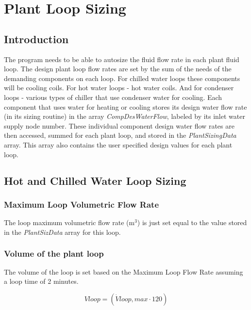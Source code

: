 \section{Plant Loop Sizing}\label{plant-loop-sizing}

\subsection{Introduction}\label{introduction-000}

The program needs to be able to autosize the fluid flow rate in each plant fluid loop. The design plant loop flow rates are set by the sum of the needs of the demanding components on each loop. For chilled water loops these components will be cooling coils. For hot water loops - hot water coils. And for condenser loops - various types of chiller that use condenser water for cooling. Each component that uses water for heating or cooling stores its design water flow rate (in its sizing routine) in the array \emph{CompDesWaterFlow}, labeled by its inlet water supply node number. These individual component design water flow rates are then accessed, summed for each plant loop, and stored in the \emph{PlantSizingData} array. This array also contains the user specified design values for each plant loop.

\subsection{Hot and Chilled Water Loop Sizing}\label{hot-and-chilled-water-loop-sizing}

\subsubsection{Maximum Loop Volumetric Flow Rate}\label{maximum-loop-volumetric-flow-rate}

The loop maximum volumetric flow rate (m\(^{3}\)) is just set equal to the value stored in the \emph{PlantSizData} array for this loop.

\subsubsection{Volume of the plant loop}\label{volume-of-the-plant-loop}

The volume of the loop is set based on the Maximum Loop Flow Rate assuming a loop time of 2 minutes.

\begin{equation}
Vloop = (\dot Vloop,max\cdot 120)
\end{equation}


